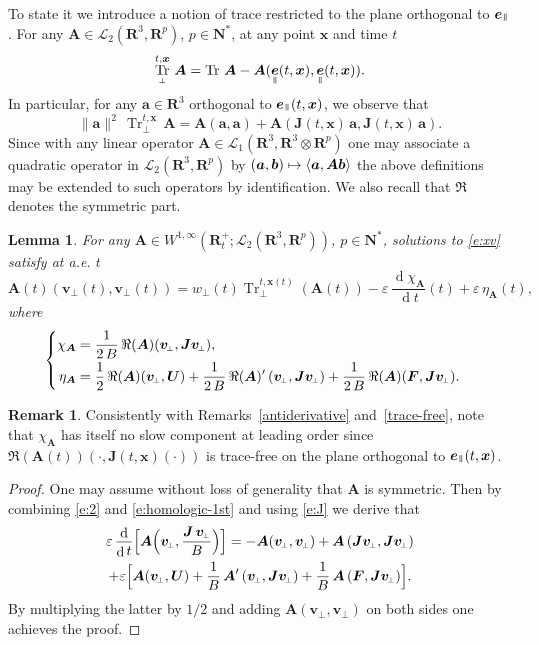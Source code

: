\documentclass[10pt]{amsart}
\let\mathcal\mathscr
\newenvironment{splitcases}
{\begin{cases}\begin{aligned}}
{\end{aligned}\end{cases}}
\newcommand\mto{\mathchoice{\longmapsto}{\mapsto}{\mapsto}{\mapsto}}
\newcommand{\sperp}{{\scriptscriptstyle\perp}}
\let\eps\varepsilon
\DeclareMathOperator\dD{d}\let\dd\dD
\DeclareMathOperator{\Tr}{Tr}
\theoremstyle{plain}
\newtheorem{lemma}[theorem]{Lemma}
\theoremstyle{definition}
\newtheorem{remark}[theorem]{Remark}
\newcommand\br{\begin{remark}}
\newcommand\er{\end{remark}}
\newcommand{\be}{\begin{equation}}
\newcommand{\ee}{\end{equation}}
\newcommand{\bl}{\begin{lemma}}
\newcommand{\el}{\end{lemma}}
\newcommand\R{\mathbf R}
\newcommand{\N}{\mathbf N}
\newcommand\bA{{\boldsymbol A}}
\newcommand\bF{{\boldsymbol F}}
\newcommand\bJ{{\boldsymbol J}}
\newcommand\bU{{\boldsymbol U}}
\newcommand\bfa{{\boldsymbol a}}
\newcommand\bfb{{\boldsymbol b}}
\newcommand\bfv{{\boldsymbol v}}
\newcommand\bfx{{\boldsymbol x}}
\newcommand\cL{{\mathcal L}}
\DeclareMathOperator{\beD}{\boldsymbol{e}}
\newcommand\eDpar{\beD_\mypar}
\newcommand\bvperp{\bfv_{\!\sperp}}
\newcommand\eperp{w_{\!\sperp}}
\newcommand{\Trperp}[1]{\Tr_\sperp^{#1}}
\newcommand{\mypar}{{\mkern3mu\vphantom{\perp}\vrule depth 0pt\mkern2mu\vrule depth 0pt\mkern3mu}}
\begin{document}
To state it we introduce a notion of trace restricted to the plane orthogonal to $\eDpar$. For any $\bA\in\cL_2(\R^3,\R^p)$, $p\in\N^*$, at any point $\bfx$ and time $t$
\be
\label{Trperp}
\Trperp{t,\bfx}\,\bA=\Tr\,\bA-\bA(\eDpar(t,\bfx),\eDpar(t,\bfx)).
\ee
In particular, for any $\bfa\in\R^3$ orthogonal to $\eDpar(t,\bfx)$,
we observe that
\[
\|\bfa\|^2\,\Trperp{t,\bfx}\,\bA
=\bA(\bfa,\bfa)+\bA(\bJ(t,\bfx)\,\bfa,\bJ(t,\bfx)\,\bfa).
\]
Since with any linear operator $\bA\in\cL_1(\R^3,\R^3\otimes\R^p)$ one may
associate a quadratic operator in $\cL_2(\R^3,\R^p)$ by
$(\bfa,\bfb)\mto \langle \bfa,\bA\bfb\rangle$ the above definitions
may be extended to such operators by identification. We also recall that $\Re$ denotes the symmetric part.

\bl
\label{2nd}
For any $\bA\in W^{1,\infty}(\R^+_t; \cL_2(\R^3,\R^p))$, $p\in\N^*$, solutions to \eqref{e:xv} satisfy at a.e. $t$
\[
\bA(t)(\bvperp(t),\bvperp(t))
=\eperp(t)\Trperp{t,\bfx(t)}\left(\bA(t)\right)-\eps\,\frac{\dD\chi_\bA}{\dD t}(t)+\eps\,\eta_\bA(t),
\]
where
\[
\begin{splitcases}
\chi_\bA &=\frac{1}{2\,B}\,\Re(\bA)(\bvperp,\bJ\bvperp),
\\
\eta_\bA&=
\frac12\,\Re(\bA)(\bvperp,\bU)
+\frac{1}{2\,B}\,\Re(\bA)'\left(\bvperp,\bJ\bvperp\right)
+\frac{1}{2\,B}\,\Re(\bA)(\bF,\bJ\bvperp).
\end{splitcases}
\]
\el

\br\label{trace-free-bis}
Consistently with Remarks~\ref{antiderivative} and~\ref{trace-free}, note that $\chi_\bA$ has itself no slow component at leading order since $\Re(\bA(t))\left(\cdot,\bJ(t,\bfx)(\cdot)\right)$ is trace-free on the plane orthogonal to $\eDpar(t,\bfx)$.
\er

\begin{proof}
One may assume without loss of generality that $\bA$ is symmetric. Then by combining \eqref{e:2} and \eqref{e:homologic-1st} and using \eqref{e:J} we derive that
\begin{multline*}
\eps\,\frac{\dD}{\dD t}\Bigl[\bA\Bigl(\bvperp,\frac{\bJ\,\bvperp}{B}\Bigr)\Bigr]
=-\bA(\bvperp,\bvperp)
+\bA\left(\bJ\bvperp,\bJ\bvperp\right)
\\
+\eps\Bigl[\bA(\bvperp,\bU)
+\frac{1}{B}\,\bA'\left(\bvperp,\bJ\bvperp\right)
+\frac{1}{B}\,\bA\left(\bF,\bJ\bvperp\right)\Bigr].
\end{multline*}
By multiplying the latter by $1/2$ and adding $\bA(\bvperp,\bvperp)$ on both sides one achieves the proof.
\end{proof}
\end{document}
